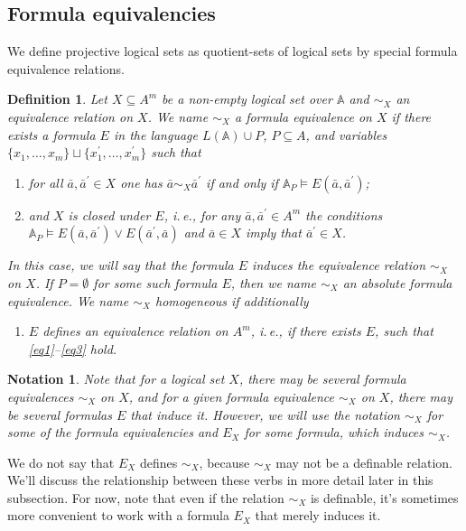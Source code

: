 \documentclass[12pt]{article}
\newtheorem{notation}{Notation}
\newtheorem{definition}{Definition}
\theoremstyle{definition}
\def\MA{{\mathbb{A}}}
\begin{document}
\subsection{Formula equivalencies}\label{subsec:for_eq}

We define projective logical sets as quotient-sets of logical sets by special formula equivalence relations. 

\begin{definition}\label{def:formula_eq}
Let $X\subseteq A^m$ be a non-empty logical set over $\MA$ and $\sim_X$ an equivalence relation on $X$. We name $\sim_X$ {\em a formula equivalence on $X$} if there exists a formula $E$ in the language $L(\MA)\cup P$, $P\subseteq A$, and variables $\{x_1,\ldots,x_m\}\sqcup \{x_1^\prime,\ldots,x_m^\prime\}$ such that
\begin{enumerate}[label=(\arabic*)]
\item\label{eq1}  for all  $\bar a,\bar a^\prime\in X$ one has $\bar a\sim_X \bar a^\prime$ if and only if  $\MA_P\models E(\bar a,\bar a^\prime)$;
\item\label{eq2} and $X$ is {\em closed under $E$}, i.\,e., for any $\bar a,\bar a^\prime\in A^m$ the conditions $\MA_P\models E(\bar a,\bar a^\prime)\vee E(\bar a^\prime,\bar a)$ and $\bar a\in X$ imply that $\bar a^\prime\in X$. 
\end{enumerate} 
In this case, we will say that the formula $E$ {\em induces} the equivalence relation $\sim_X$ on $X$. If $P=\emptyset$ for some such formula $E$, then we name $\sim_X$ an {\em absolute} formula equivalence. We name $\sim_X$ {\em homogeneous} if additionally
\begin{enumerate}[label=(\arabic*)]\addtocounter{enumi}{2}
\item\label{eq3} $E$ defines an equivalence relation on $A^m$, i.\,e., if there exists $E$, such that \ref{eq1}--\ref{eq3} hold.
\end{enumerate}
\end{definition}

\begin{notation}
Note that for a logical set $X$, there may be several formula equivalences $\sim_X$ on $X$, and for a given formula equivalence $\sim_X$ on $X$, there may be several formulas $E$ that induce it. However, we will use the notation $\sim_X$ for some of the formula equivalencies and $E_X$ for some formula, which induces $\sim_X$.
\end{notation}

We do not say that $E_X$ defines $\sim_X$, because $\sim_X$ may not be a definable relation. We'll discuss the relationship between these verbs in more detail later in this subsection. For now, note that even if the relation $\sim_X$ is definable, it's sometimes more convenient to work with a formula $E_X$ that merely induces it.
\end{document}
